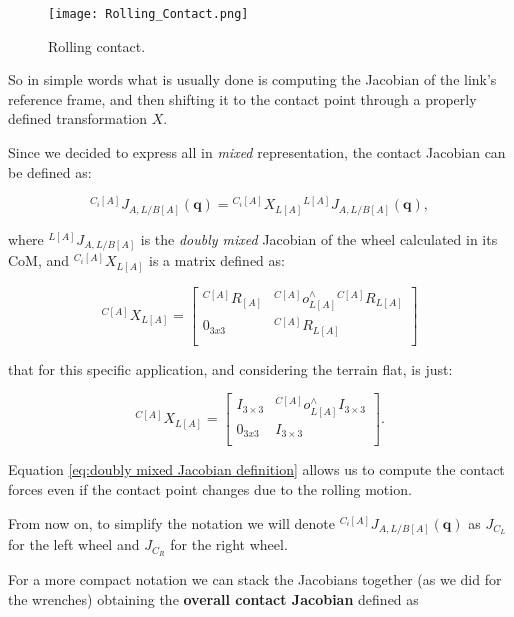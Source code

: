 \begin{figure}
    \centering
    \texttt{[image: Rolling\_Contact.png]}
    \caption{Rolling contact.}
    \label{fig:Rolling contact}
\end{figure}


So in simple words what is usually done is computing the Jacobian of the link's reference frame, and then shifting it to the contact point through a properly defined transformation $X$.


Since we decided to express all in \textit{mixed} representation, the contact Jacobian can be defined as:

    \begin{equation}
        {}^{C_i[A]} J_{A,L/B[A]}(\mathbf{q}) = {}^{C_i[A]}X_{L[A]} {}^{L[A]}J_{A,L/B[A]}(\mathbf{q}),
    \end{equation}
    
where ${}^{L[A]}J_{A,L/B[A]}$ is the \textit{doubly mixed} Jacobian of the wheel calculated in its CoM, and ${}^{C_i[A]}X_{L[A]}$ is a matrix defined as:

\begin{equation}
{}^{C[A]}  X_{L[A]} = \begin{bmatrix} 
{}^{C[A]}  R_{[A]} &    {}^{C[A]} o^\wedge_{L[A]}  {}^{C[A]} R_{L[A]} \\
0_{3x3} & {}^{C[A]} R_{L[A]}\\  
\end{bmatrix}
\end{equation}

that for this specific application, and considering the terrain flat, is just:

\begin{equation}
{}^{C[A]}  X_{L[A]} = \begin{bmatrix} 
I_{3 \times 3} &    {}^{C[A]} o^\wedge_{L[A]} I_{3 \times 3} \\
0_{3x3} & I_{3 \times 3}\\  
\end{bmatrix}.
\end{equation}

Equation \eqref{eq:doubly mixed Jacobian definition} allows us to compute the contact forces even if the contact point changes due to the rolling motion.

From now on, to simplify the notation we will denote ${}^{C_i[A]} J_{A,L/B[A]}(\mathbf{q})$ as $J_{C_{L}}$ for the left wheel and $J_{C_{R}}$ for the right wheel.

For a more compact notation we can stack the Jacobians together (as we did for the wrenches) obtaining the \textbf{overall contact Jacobian} defined as


